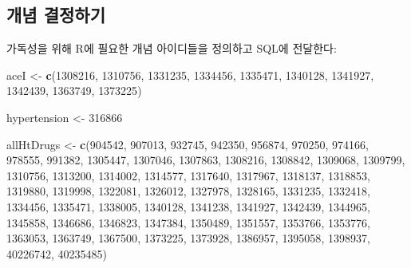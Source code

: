 \documentclass[11pt]{book}
\newenvironment{Shaded}{\begin{snugshade}}{\end{snugshade}}
\newcommand{\KeywordTok}[1]{\textcolor[rgb]{0.13,0.29,0.53}{\textbf{#1}}}
\newcommand{\DecValTok}[1]{\textcolor[rgb]{0.00,0.00,0.81}{#1}}
\newcommand{\StringTok}[1]{\textcolor[rgb]{0.31,0.60,0.02}{#1}}
\newcommand{\NormalTok}[1]{#1}
\theoremstyle{definition}
\theoremstyle{definition}
\theoremstyle{definition}
\theoremstyle{remark}
\begin{document}
\subsection{개념 결정하기}\label{-}

가독성을 위해 R에 필요한 개념 아이디들을 정의하고 SQL에 전달한다:

\begin{Shaded}
\begin{Highlighting}[]
\NormalTok{aceI <-}\StringTok{ }\KeywordTok{c}\NormalTok{(}\DecValTok{1308216}\NormalTok{, }\DecValTok{1310756}\NormalTok{, }\DecValTok{1331235}\NormalTok{, }\DecValTok{1334456}\NormalTok{, }\DecValTok{1335471}\NormalTok{, }\DecValTok{1340128}\NormalTok{, }\DecValTok{1341927}\NormalTok{,}
          \DecValTok{1342439}\NormalTok{, }\DecValTok{1363749}\NormalTok{, }\DecValTok{1373225}\NormalTok{)}

\NormalTok{hypertension <-}\StringTok{ }\DecValTok{316866}

\NormalTok{allHtDrugs <-}\StringTok{ }\KeywordTok{c}\NormalTok{(}\DecValTok{904542}\NormalTok{, }\DecValTok{907013}\NormalTok{, }\DecValTok{932745}\NormalTok{, }\DecValTok{942350}\NormalTok{, }\DecValTok{956874}\NormalTok{, }\DecValTok{970250}\NormalTok{, }\DecValTok{974166}\NormalTok{,}
                  \DecValTok{978555}\NormalTok{, }\DecValTok{991382}\NormalTok{, }\DecValTok{1305447}\NormalTok{, }\DecValTok{1307046}\NormalTok{, }\DecValTok{1307863}\NormalTok{, }\DecValTok{1308216}\NormalTok{,}
                  \DecValTok{1308842}\NormalTok{, }\DecValTok{1309068}\NormalTok{, }\DecValTok{1309799}\NormalTok{, }\DecValTok{1310756}\NormalTok{, }\DecValTok{1313200}\NormalTok{, }\DecValTok{1314002}\NormalTok{,}
                  \DecValTok{1314577}\NormalTok{, }\DecValTok{1317640}\NormalTok{, }\DecValTok{1317967}\NormalTok{, }\DecValTok{1318137}\NormalTok{, }\DecValTok{1318853}\NormalTok{, }\DecValTok{1319880}\NormalTok{,}
                  \DecValTok{1319998}\NormalTok{, }\DecValTok{1322081}\NormalTok{, }\DecValTok{1326012}\NormalTok{, }\DecValTok{1327978}\NormalTok{, }\DecValTok{1328165}\NormalTok{, }\DecValTok{1331235}\NormalTok{,}
                  \DecValTok{1332418}\NormalTok{, }\DecValTok{1334456}\NormalTok{, }\DecValTok{1335471}\NormalTok{, }\DecValTok{1338005}\NormalTok{, }\DecValTok{1340128}\NormalTok{, }\DecValTok{1341238}\NormalTok{,}
                  \DecValTok{1341927}\NormalTok{, }\DecValTok{1342439}\NormalTok{, }\DecValTok{1344965}\NormalTok{, }\DecValTok{1345858}\NormalTok{, }\DecValTok{1346686}\NormalTok{, }\DecValTok{1346823}\NormalTok{,}
                  \DecValTok{1347384}\NormalTok{, }\DecValTok{1350489}\NormalTok{, }\DecValTok{1351557}\NormalTok{, }\DecValTok{1353766}\NormalTok{, }\DecValTok{1353776}\NormalTok{, }\DecValTok{1363053}\NormalTok{,}
                  \DecValTok{1363749}\NormalTok{, }\DecValTok{1367500}\NormalTok{, }\DecValTok{1373225}\NormalTok{, }\DecValTok{1373928}\NormalTok{, }\DecValTok{1386957}\NormalTok{, }\DecValTok{1395058}\NormalTok{,}
                  \DecValTok{1398937}\NormalTok{, }\DecValTok{40226742}\NormalTok{, }\DecValTok{40235485}\NormalTok{)}
\end{Highlighting}
\end{Shaded}
\end{document}
